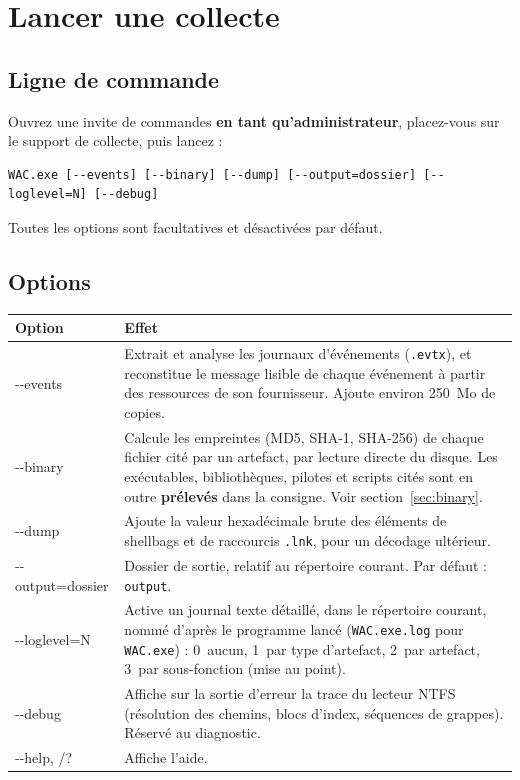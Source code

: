 \documentclass[11pt,a4paper,oneside]{report}
\newcommand{\fichier}[1]{\texttt{#1}}
\begin{document}
\chapter{Lancer une collecte}

\section{Ligne de commande}

Ouvrez une invite de commandes \textbf{en tant qu'administrateur}, placez-vous
sur le support de collecte, puis lancez :

\begin{lstlisting}
WAC.exe [--events] [--binary] [--dump] [--output=dossier] [--loglevel=N] [--debug]
\end{lstlisting}

Toutes les options sont facultatives et désactivées par défaut.

\section{Options}

\begin{longtable}{@{}>{\ttfamily}L{3.2cm}L{11.2cm}@{}}
\toprule
\normalfont\bfseries Option & \bfseries Effet \\
\midrule
\endhead
-{}-events & Extrait et analyse les journaux d'événements (\fichier{.evtx}), et
  reconstitue le message lisible de chaque événement à partir des ressources de
  son fournisseur. Ajoute environ 250~Mo de copies. \\
-{}-binary & Calcule les empreintes (MD5, SHA-1, SHA-256) de chaque fichier cité
  par un artefact, par lecture directe du disque. Les exécutables, bibliothèques,
  pilotes et scripts cités sont en outre \textbf{prélevés} dans la consigne. Voir
  section~\ref{sec:binary}. \\
-{}-dump & Ajoute la valeur hexadécimale brute des éléments de shellbags et de
  raccourcis \fichier{.lnk}, pour un décodage ultérieur. \\
-{}-output=dossier & Dossier de sortie, relatif au répertoire courant. Par défaut :
  \fichier{output}. \\
-{}-loglevel=N & Active un journal texte détaillé, dans le répertoire courant,
  nommé d'après le programme lancé (\fichier{WAC.exe.log} pour \fichier{WAC.exe}) : 0~aucun, 1~par type
  d'artefact, 2~par artefact, 3~par sous-fonction (mise au point). \\
-{}-debug & Affiche sur la sortie d'erreur la trace du lecteur NTFS (résolution
  des chemins, blocs d'index, séquences de grappes). Réservé au diagnostic. \\
-{}-help, /? & Affiche l'aide. \\
\bottomrule
\end{longtable}
\end{document}
